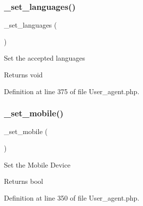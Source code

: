 \mbox{\label{class_c_i___user__agent_a14307e07c78ada7733b36660bce03db8}} 
\subsubsection{\texorpdfstring{\_set\_languages()}{\_set\_languages()}}
{\footnotesize\ttfamily \+\_\+set\+\_\+languages (\begin{DoxyParamCaption}{ }\end{DoxyParamCaption})\hspace{0.3cm}{\ttfamily [protected]}}

Set the accepted languages

\begin{DoxyReturn}{Returns}
void 
\end{DoxyReturn}


Definition at line 375 of file User\+\_\+agent.\+php.

\mbox{\label{class_c_i___user__agent_aa2b84face2c8bd1830f618bf9a57f196}} 
\subsubsection{\texorpdfstring{\_set\_mobile()}{\_set\_mobile()}}
{\footnotesize\ttfamily \+\_\+set\+\_\+mobile (\begin{DoxyParamCaption}{ }\end{DoxyParamCaption})\hspace{0.3cm}{\ttfamily [protected]}}

Set the Mobile Device

\begin{DoxyReturn}{Returns}
bool 
\end{DoxyReturn}


Definition at line 350 of file User\+\_\+agent.\+php.

\mbox{\label{class_c_i___user__agent_a3e3af24bc0adb0483c3965765b28a25b}} 
